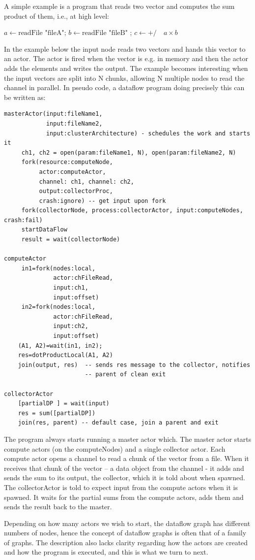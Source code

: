 \documentclass[11pt,a4paper]{article}
\begin{document}
\begin{Example}

  A simple example is a program that reads two vector and computes the
  sum product of them, i.e., at high level:
\begin{algorithmic}
  \State $a\gets \textrm{readFile "fileA"}$;  $b\gets \textrm{readFile "fileB"}$ ; $c\gets  \textrm{+/} \quad a\times b$
\end{algorithmic}  
In the example below the input node reads two vectors and hands this
vector to an actor.  The actor is fired when the vector is e.g. in
memory and then the actor adds the elements and writes the output. The
example becomes interesting when the input vectors are split into N
chunks, allowing N multiple nodes to read the channel in parallel.  In
pseudo code, a dataflow program doing precisely this can be written
as:
\begin{lstlisting}
masterActor(input:fileName1, 
            input:fileName2, 
            input:clusterArchitecture) - schedules the work and starts it
     ch1, ch2 = open(param:fileName1, N), open(param:fileName2, N)
     fork(resource:computeNode, 
          actor:computeActor, 
          channel: ch1, channel: ch2,
          output:collectorProc,
          crash:ignore) -- get input upon fork
     fork(collectorNode, process:collectorActor, input:computeNodes, crash:fail)
     startDataFlow
     result = wait(collectorNode)

computeActor
     in1=fork(nodes:local, 
              actor:chFileRead, 
              input:ch1,
              input:offset)
     in2=fork(nodes:local, 
              actor:chFileRead, 
              input:ch2,
              input:offset)
    (A1, A2)=wait(in1, in2);
    res=dotProductLocal(A1, A2)
    join(output, res)  -- sends res message to the collector, notifies
                       -- parent of clean exit

collectorActor
    [partialDP ] = wait(input)
    res = sum([partialDP])
    join(res, parent) -- default case, join a parent and exit

\end{lstlisting}

The program always starts running a master actor which. The master
actor starts compute actors (on the computeNodes) and a single
collector actor. Each compute actor opens a channel to read a chunk of
the vector from a file. When it receives that chunk of the vector – a
data object from the channel - it adds and sends the sum to its
output, the collector, which it is told about when spawned.  The
collectorActor is told to expect input from the compute actors when
it is spawned. It waits for the partial sums from the compute actors,
adds them and sends the result back to the master.

Depending on how many actors we wish to start, the dataflow graph has
different numbers of nodes, hence the concept of dataflow graphs is
often that of a family of graphs.  The description also lacks clarity
regarding how the actors are created and how the program is executed,
and this is what we turn to next.

\end{Example}
\end{document}
